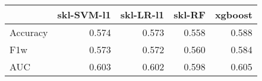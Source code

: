 \begin{tabular}{lrrrr}
\toprule
{} &  skl-SVM-l1 &  skl-LR-l1 &  skl-RF &  xgboost \\
\midrule
Accuracy &       0.574 &      0.573 &   0.558 &    0.588 \\
F1w      &       0.573 &      0.572 &   0.560 &    0.584 \\
AUC      &       0.603 &      0.602 &   0.598 &    0.605 \\
\bottomrule
\end{tabular}
